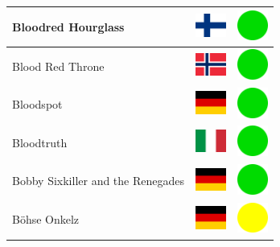 \documentclass[12pt, a4paper, twoside]{report}
\begin{document}
\begin{center}
\begin{longtable}{|p{5cm}|p{2cm}|p{2cm}|}
Bloodred Hourglass & \includegraphics[width=1cm]{4x3/fi} & \includegraphics[width=1cm]{likes/y} \\ \hline
Blood Red Throne & \includegraphics[width=1cm]{4x3/no} & \includegraphics[width=1cm]{likes/y} \\ \hline
Bloodspot & \includegraphics[width=1cm]{4x3/de} & \includegraphics[width=1cm]{likes/y} \\ \hline
Bloodtruth & \includegraphics[width=1cm]{4x3/it} & \includegraphics[width=1cm]{likes/y} \\ \hline
Bobby Sixkiller and the Renegades & \includegraphics[width=1cm]{4x3/de} & \includegraphics[width=1cm]{likes/y} \\ \hline
Böhse Onkelz & \includegraphics[width=1cm]{4x3/de} & \includegraphics[width=1cm]{likes/m} \\ \hline

\end{longtable}
\end{center}
\end{document}
